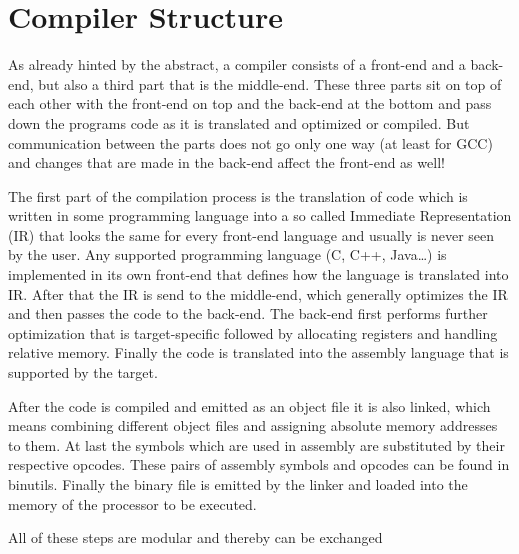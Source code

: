 \chapter{Compiler Structure}
\label{chapter:compiler structure}
As already hinted by the abstract, a compiler consists of a front-end and a back-end, but also a third part that is the middle-end. These three parts sit on top of each other with the front-end on top and the back-end at the bottom and pass down the programs code as it is translated and optimized or compiled. But communication between the parts does not go only one way (at least for GCC)
and changes that are made in the back-end affect the front-end as well!

The first part of the compilation process is the translation of code which is written in some programming language into a so called Immediate Representation (IR) that looks the same for every front-end language and usually is never seen by the user. Any supported programming language (C, C++, Java…) is implemented in its own front-end that defines how the language is translated into IR. After that the IR is send to the middle-end, which generally optimizes the IR and then passes the code to the back-end. The back-end first performs further optimization that is target-specific followed by allocating registers and handling relative memory. Finally the code is translated into the assembly language that is supported by the target.

After the code is compiled and emitted as an object file it is also linked, which means combining different object files and assigning absolute memory addresses to them. At last the symbols which are used in assembly are substituted by their respective opcodes. These pairs of assembly symbols and opcodes can be found in binutils. Finally the  binary file is emitted by the linker and loaded into the memory of the processor to be executed.

All of these steps are modular and thereby can be exchanged 
